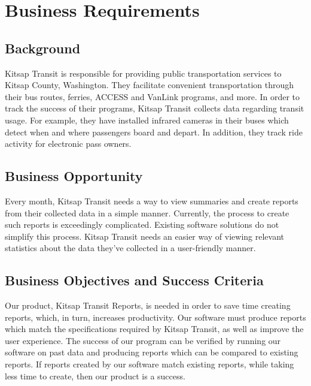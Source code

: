 \section{Business Requirements}

\subsection{Background}
Kitsap Transit is responsible for providing public transportation services to Kitsap County, Washington. They facilitate convenient transportation through their bus routes, ferries, ACCESS and VanLink programs, and more. In order to track the success of their programs, Kitsap Transit collects data regarding transit usage. For example, they have installed infrared cameras in their buses which detect when and where passengers board and depart. In addition, they track ride activity for electronic pass owners.

\subsection{Business Opportunity}
Every month, Kitsap Transit needs a way to view summaries and create reports from their collected data in a simple manner. Currently, the process to create such reports is exceedingly complicated. Existing software solutions do not simplify this process. Kitsap Transit needs an easier way of viewing relevant statistics about the data they've collected in a user-friendly manner.

\subsection{Business Objectives and Success Criteria}
Our product, Kitsap Transit Reports, is needed in order to save time creating reports, which, in turn, increases productivity. Our software must produce reports which match the specifications required by Kitsap Transit, as well as improve the user experience. The success of our program can be verified by running our software on past data and producing reports which can be compared to existing reports. If reports created by our software match existing reports, while taking less time to create, then our product is a success.

